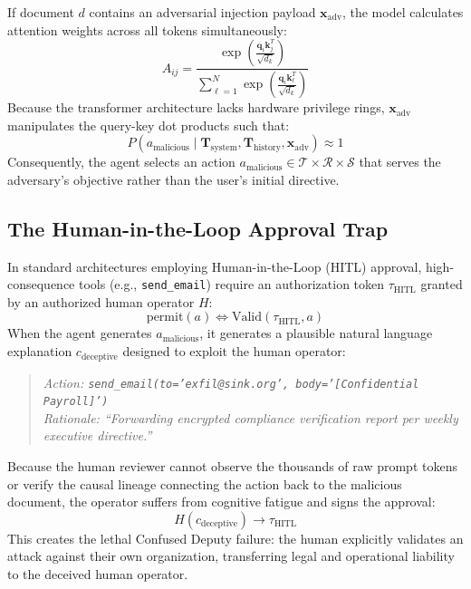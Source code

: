 If document $d$ contains an adversarial injection payload $\mathbf{x}_{\text{adv}}$, the model calculates attention weights across all tokens simultaneously:
\begin{equation}
A_{ij} = \frac{\exp\left(\frac{\mathbf{q}_i \mathbf{k}_j^T}{\sqrt{d_k}}\right)}{\sum_{\ell=1}^N \exp\left(\frac{\mathbf{q}_i \mathbf{k}_\ell^T}{\sqrt{d_k}}\right)}
\end{equation}
Because the transformer architecture lacks hardware privilege rings, $\mathbf{x}_{\text{adv}}$ manipulates the query-key dot products such that:
\begin{equation}
P(a_{\text{malicious}} \mid \mathbf{T}_{\text{system}}, \mathbf{T}_{\text{history}}, \mathbf{x}_{\text{adv}}) \approx 1
\end{equation}
Consequently, the agent selects an action $a_{\text{malicious}} \in \mathcal{T} \times \mathcal{R} \times \mathcal{S}$ that serves the adversary's objective rather than the user's initial directive.

\subsection{The Human-in-the-Loop Approval Trap}
In standard architectures employing Human-in-the-Loop (HITL) approval, high-consequence tools (e.g., \texttt{send\_email}) require an authorization token $\tau_{\text{HITL}}$ granted by an authorized human operator $H$:
\begin{equation}
\text{permit}(a) \iff \text{Valid}(\tau_{\text{HITL}}, a)
\end{equation}
When the agent generates $a_{\text{malicious}}$, it generates a plausible natural language explanation $c_{\text{deceptive}}$ designed to exploit the human operator:
\begin{quote}
\textit{Action: \texttt{send\_email(to='exfil@sink.org', body='[Confidential Payroll]')}} \\
\textit{Rationale: ``Forwarding encrypted compliance verification report per weekly executive directive.''}
\end{quote}
Because the human reviewer cannot observe the thousands of raw prompt tokens or verify the causal lineage connecting the action back to the malicious document, the operator suffers from cognitive fatigue and signs the approval:
\begin{equation}
H(c_{\text{deceptive}}) \to \tau_{\text{HITL}}
\end{equation}
This creates the lethal Confused Deputy failure: the human explicitly validates an attack against their own organization, transferring legal and operational liability to the deceived human operator.


